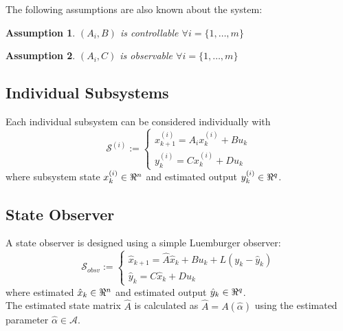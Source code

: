 \documentclass[]{article}
\newtheorem{assumption}{Assumption}
\begin{document}
The following assumptions are also known about the system:
\begin{assumption}\label{asmp:controllable}
    $(A_i, B)$ is controllable $\forall i = \{1, \dots, m\}$
\end{assumption}
\begin{assumption}\label{asmp:observable}
    $(A_i, C)$ is observable $\forall i = \{1, \dots, m\}$
\end{assumption}

\subsection{Individual Subsystems}
Each individual subsystem can be considered individually with
\begin{equation}\label{eq:subsys_def}
    \mathcal{S}^{(i)} :=
    \begin{cases}
        x_{k+1}^{(i)} = A_i x_k^{(i)} + B u_k\\
        y_{k}^{(i)} = C x_k^{(i)} + D u_k
    \end{cases}
\end{equation}
where subsystem state $x_k^{(i)} \in \real^n$ 
and estimated output $y_k^{(i)} \in \real^q$.\\

\subsection{State Observer}
A state observer is designed using a simple Luemburger observer:
\begin{equation}\label{eq:obsv_def}
    \mathcal{S}_{obsv} :=
    \begin{cases}
        \hat{x}_{k+1} = \hat{A} \hat{x}_k + B u_k + L(y_k - \hat{y}_k)\\
        \hat{y}_k = C \hat{x}_k + D u_k
    \end{cases}
\end{equation}
where estimated $\hat{x}_k \in \real^n$ and estimated output $\hat{y}_k \in \real^q$.\\
The estimated state matrix $\hat{A}$ is calculated as $\hat{A} = A(\hat{\alpha})$ 
using the estimated parameter $\hat{\alpha} \in \mathcal{A}$.\\
\end{document}
